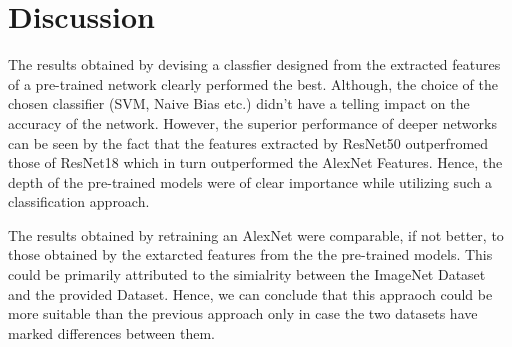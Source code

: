 \documentclass[doc/report.tex]{subfiles}
\begin{document}
\section{Discussion}

The results obtained by devising a classfier designed from the extracted features of a pre-trained network clearly performed the best. Although, the choice of the chosen classifier (SVM, Naive Bias etc.) didn't have a telling impact on the accuracy of the network. However, the superior performance of deeper networks can be seen by the fact that the features extracted by ResNet50 outperfromed those of ResNet18 which in turn outperformed the AlexNet Features. Hence, the depth of the pre-trained models were of clear importance while utilizing such a classification approach.

The results obtained by retraining an AlexNet were comparable, if not better, to those obtained by the extarcted features from the the pre-trained models. This could be primarily attributed to the simialrity between the ImageNet Dataset and the provided Dataset. Hence, we can conclude that this appraoch could be more suitable than the previous approach only in case the two datasets have marked differences between them.  
    
\end{document}
